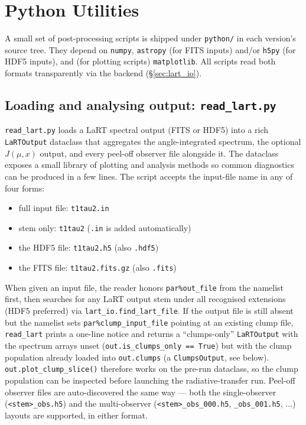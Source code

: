 \documentclass[english,a4paper]{my_memo}
\newcommand{\parm}[1]{\texttt{par\%#1}}
\begin{document}
\section{Python Utilities}
\label{sec:python}

A small set of post-processing scripts is shipped under \texttt{python/}
in each version's source tree.  They depend on \texttt{numpy},
\texttt{astropy} (for FITS inputs) and/or \texttt{h5py} (for HDF5
inputs), and (for plotting scripts) \texttt{matplotlib}.  All scripts
read both formats transparently via the  backend
(\S\ref{sec:lart_io}).

\subsection{Loading and analysing output: \texttt{read\_lart.py}}
\label{sec:read_lart}

\texttt{read\_lart.py} loads a LaRT spectral output (FITS or HDF5) into
a rich \texttt{LaRTOutput} dataclass that aggregates the angle-integrated
spectrum, the optional $J(\mu, x)$ output, and every peel-off observer
file alongside it.  The dataclass exposes a small library of plotting
and analysis methods so common diagnostics can be produced in a few
lines.  The script accepts the input-file name in any of four forms:
\begin{itemize}
  \item full input file: \texttt{t1tau2.in}
  \item stem only:        \texttt{t1tau2}      (\texttt{.in} is added automatically)
  \item the HDF5 file:   \texttt{t1tau2.h5} (also \texttt{.hdf5})
  \item the FITS file:    \texttt{t1tau2.fits.gz} (also \texttt{.fits})
\end{itemize}
When given an input file, the reader honors \parm{out\_file} from the
namelist first, then searches for any LaRT output stem under all
recognised extensions (HDF5 preferred) via
\texttt{lart\_io.find\_lart\_file}.  If the output file is still absent
but the namelist sets \parm{clump\_input\_file} pointing at an existing
clump file, \texttt{read\_lart} prints a one-line notice and returns a
``clumps-only'' \texttt{LaRTOutput} with the spectrum arrays unset
(\texttt{out.is\_clumps\_only == True}) but with the clump population
already loaded into \texttt{out.clumps} (a \texttt{ClumpsOutput}, see
below).  \texttt{out.plot\_clump\_slice()} therefore works on the
pre-run dataclass, so the clump population can be inspected before
launching the radiative-transfer run.  Peel-off observer files are
auto-discovered the same way --- both the single-observer
(\texttt{<stem>\_obs.h5}) and the multi-observer
(\texttt{<stem>\_obs\_000.h5}, \texttt{\_obs\_001.h5}, $\ldots$) layouts
are supported, in either format.
\end{document}
